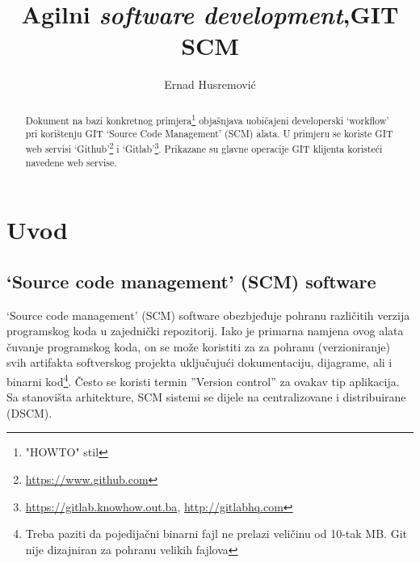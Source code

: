 \documentclass[times, utf8, seminar]{fit}
\begin{document}



\title{Agilni \emph{software development},\newline GIT SCM}

\author{Ernad Husremović}


\maketitle

\tableofcontents

\newpage

\begin{abstract}

Dokument na bazi konkretnog primjera\footnote{"HOWTO" stil} objašnjava uobičajeni developerski `workflow' pri korištenju GIT `Source Code Management' (SCM) alata. 
U primjeru se koriste GIT web servisi `Github'\footnote{\url{https://www.github.com}} i `Gitlab'\footnote{\url{https://gitlab.knowhow.out.ba}, \url{http://gitlabhq.com}}.
Prikazane su glavne operacije GIT klijenta koristeći navedene web servise.


\end{abstract}


\chapter{Uvod}

\vspace*{-1.2cm}
\section{`Source code management' (SCM) software}

`Source code management' (SCM) software obezbjeđuje pohranu različitih verzija programskog koda u zajednički repozitorij. 
Iako je primarna namjena ovog alata čuvanje programskog koda, on se može koristiti za za pohranu (verzioniranje) svih artifakta softverskog projekta uključujući dokumentaciju, dijagrame, ali i binarni kod\footnote{Treba paziti da pojedijačni binarni fajl ne prelazi veličinu od 10-tak MB. Git nije dizajniran za pohranu velikih fajlova}. Često se koristi termin ''Version control'' za ovakav tip aplikacija.
Sa stanovišta arhitekture, SCM sistemi se dijele na centralizovane i distribuirane (DSCM).
\end{document}
